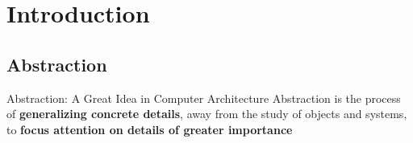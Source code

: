 \section{Introduction}
\subsection{Abstraction}
\begin{frame}[fragile]{ Abstraction: A Great Idea in Computer Architecture}
	Abstraction is the process of \textbf{generalizing concrete details}, away from the study of objects and systems, to \textbf{focus attention on details of greater importance}

\end{frame}

